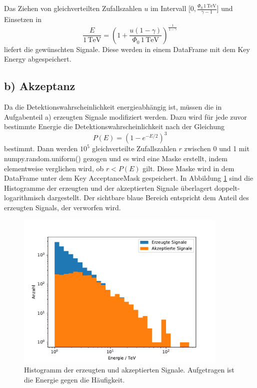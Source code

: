 \documentclass[a4paper, 11pt]{article}
\begin{document}
Das Ziehen von gleichverteilten Zufallszahlen $u$ im Intervall
$\lbrack 0, \frac{\Phi_0 \, 1\,\text{TeV}}{\gamma -1} \rbrack$ und Einsetzen in
\begin{equation}
  \frac{E}{1\,\text{TeV}}
  = \left(1+\frac{u (1-\gamma)}{\Phi_0\, 1\,\text{TeV}}\right)^{\frac{1}{1-\gamma}}
\end{equation}
liefert die gewünschten Signale. Diese werden in einem DataFrame mit dem Key
Energy abgespeichert.

\FloatBarrier
\subsection*{b) Akzeptanz}
Da die Detektionswahrscheinlichkeit energieabhängig ist, müssen die in Aufgabenteil
a) erzeugten Signale modifiziert werden.
Dazu wird für jede zuvor bestimmte Energie die Detektionswahrscheinlichkeit nach
der Gleichung
\begin{equation}
  P(E) = (1-e^{-E/2})^3
\end{equation}
bestimmt. Dann werden $10^5$ gleichverteilte Zufallszahlen $r$ zwischen 0 und 1
mit numpy.random.uniform() gezogen und es wird eine Maske erstellt, indem
elementweise verglichen wird, ob $r<P(E)$ gilt. Diese Maske wird in dem DataFrame
unter dem Key AcceptanceMask gespeichert.
In Abbildung \ref{fig:akzeptiertes-signal} sind die Histogramme der erzeugten und
der akzeptierten Signale überlagert doppelt-logarithmisch dargestellt. Der sichtbare
blaue Bereich entspricht dem Anteil des erzeugten Signals, der verworfen wird.
\begin{figure}
  \centering
  \includegraphics[width=0.9\textwidth]{../Energie.pdf}
  \caption{Histogramm der erzeugten und akzeptierten Signale. Aufgetragen ist die
  Energie gegen die Häufigkeit.}
  \label{fig:akzeptiertes-signal}
\end{figure}
\end{document}
